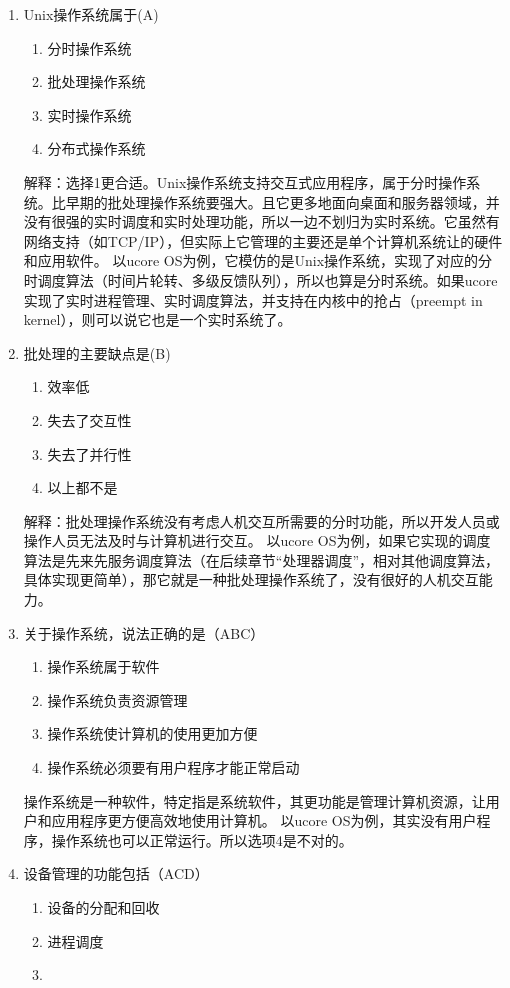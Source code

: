 \begin{enumerate}
\item Unix操作系统属于(A)
\begin{enumerate}[A]
	\item 
	分时操作系统 
	\item 
	批处理操作系统
	\item 
	实时操作系统
	\item 
	分布式操作系统
\end{enumerate}
解释：选择1更合适。Unix操作系统支持交互式应用程序，属于分时操作系统。比早期的批处理操作系统要强大。且它更多地面向桌面和服务器领域，并没有很强的实时调度和实时处理功能，所以一边不划归为实时系统。它虽然有网络支持（如TCP/IP），但实际上它管理的主要还是单个计算机系统让的硬件和应用软件。 以ucore OS为例，它模仿的是Unix操作系统，实现了对应的分时调度算法（时间片轮转、多级反馈队列），所以也算是分时系统。如果ucore实现了实时进程管理、实时调度算法，并支持在内核中的抢占（preempt in kernel），则可以说它也是一个实时系统了。
\item 批处理的主要缺点是(B)
\begin{enumerate}[A]
	\item 
	效率低
	\item 
	失去了交互性 
	\item 
	失去了并行性
	\item 
	以上都不是
\end{enumerate}
解释：批处理操作系统没有考虑人机交互所需要的分时功能，所以开发人员或操作人员无法及时与计算机进行交互。 以ucore OS为例，如果它实现的调度算法是先来先服务调度算法（在后续章节“处理器调度”，相对其他调度算法，具体实现更简单），那它就是一种批处理操作系统了，没有很好的人机交互能力。
\item 关于操作系统，说法正确的是（ABC）
\begin{enumerate}[A]
	\item  操作系统属于软件
	\item 
	操作系统负责资源管理
	\item 
	操作系统使计算机的使用更加方便
	\item 
	操作系统必须要有用户程序才能正常启动
\end{enumerate}
操作系统是一种软件，特定指是系统软件，其更功能是管理计算机资源，让用户和应用程序更方便高效地使用计算机。 以ucore OS为例，其实没有用户程序，操作系统也可以正常运行。所以选项4是不对的。
\item 设备管理的功能包括（ACD）
\begin{enumerate}[A]
	\item  设备的分配和回收
	\item 
	进程调度
	\item 

\end{enumerate}
\end{enumerate}

